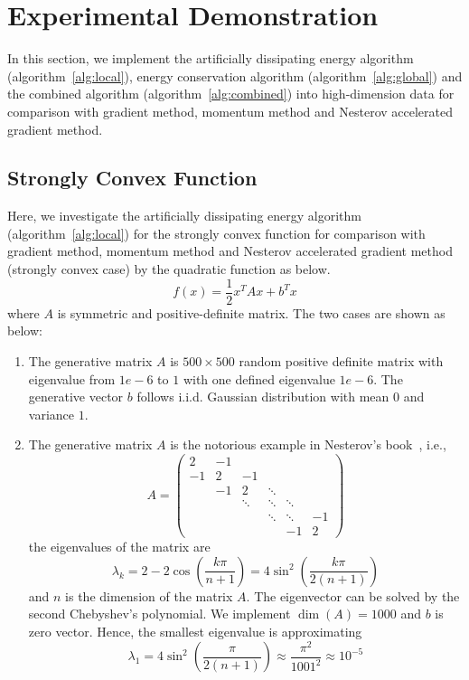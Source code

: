 \documentclass[11pt,fceqn]{article}
\numberwithin{equation}{section}
\theoremstyle{definition}
\begin{document}
\section{Experimental Demonstration}
\label{sec:experimental}
In this section, we implement the artificially dissipating energy algorithm (algorithm~\ref{alg:local}), energy conservation algorithm (algorithm~\ref{alg:global}) and the combined algorithm (algorithm~\ref{alg:combined}) into  high-dimension data for comparison with gradient method, momentum method and Nesterov accelerated gradient method.
\subsection{Strongly Convex Function}
Here, we investigate the artificially dissipating energy algorithm (algorithm~\ref{alg:local}) for the strongly convex function for comparison with gradient method, momentum method and Nesterov accelerated gradient method (strongly convex case) by the quadratic function as below. 
\begin{equation}
\label{eqn:strong}
f(x) = \frac{1}{2}x^{T} Ax + b^{T}x
\end{equation}
where $A$ is symmetric and positive-definite matrix.  The two cases are shown as below:
\begin{enumerate}[label=\textbf{(\alph*)}]
\item The generative matrix $A$ is $500\times 500$ random positive definite matrix with eigenvalue from $1e-6$ to $1$ with one defined eigenvalue $1e-6$. The generative vector $b$ follows  i.i.d. Gaussian distribution with mean $0$ and variance $1$.  
\item The generative matrix $A$ is the notorious example in Nesterov's book~\citep{nesterov2013introductory}, i.e.,
         $$
         A = \begin{pmatrix}
                2 & -1 &   &  &&\\
                -1 &2  &-1&  &&\\
                    &-1 & 2 &\ddots  &&\\
                    &     &\ddots  &\ddots &\ddots &            \\
                    &     &  &\ddots  &\ddots       &-1   \\
                    &      &          &   & -1   &2  
               \end{pmatrix}
         $$
         the eigenvalues of the matrix are
         $$
         \lambda_{k} = 2 - 2\cos\left(\frac{k\pi}{n+1}\right) = 4\sin^{2}\left(\frac{k\pi}{2(n+1)}\right)
         $$ 
         and $n$ is the dimension of the matrix $A$. The eigenvector can be solved by the second Chebyshev's polynomial. We implement $\dim(A) = 1000$   
         and $b$ is zero vector.  Hence, the smallest eigenvalue is approximating
         $$
         \lambda_{1} = 4\sin^{2}\left(\frac{\pi}{2(n+1)}\right) \approx \frac{\pi^{2}}{1001^{2}} \approx 10^{-5}
         $$
\end{enumerate}
\end{document}
